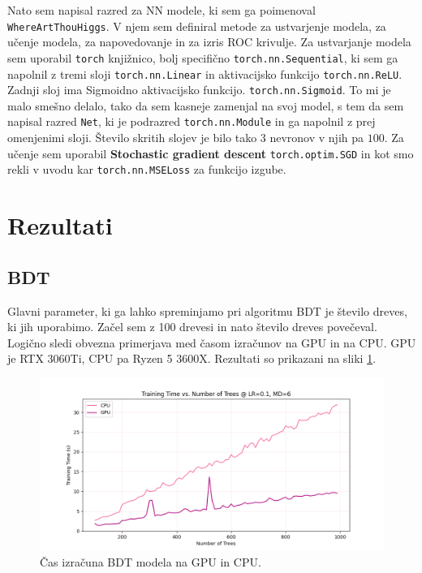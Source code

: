\documentclass[a4paper]{article}
\begin{document}
Nato sem napisal razred za NN modele, ki sem ga poimenoval \texttt{WhereArtThouHiggs}. V njem sem definiral metode za
ustvarjenje modela, za učenje modela, za napovedovanje in za izris ROC krivulje. Za ustvarjanje modela sem uporabil
\texttt{torch} knjižnico, bolj specifično \texttt{torch.nn.Sequential}, ki sem ga napolnil z tremi sloji 
\texttt{torch.nn.Linear} in aktivacijsko funkcijo \texttt{torch.nn.ReLU}. Zadnji sloj ima Sigmoidno aktivacijsko funkcijo.
\texttt{torch.nn.Sigmoid}. To mi je malo smešno delalo, tako da sem kasneje zamenjal na svoj model, s tem da sem napisal razred
\texttt{Net}, ki je podrazred \texttt{torch.nn.Module} in ga napolnil z prej omenjenimi sloji. Število skritih slojev je bilo tako $3$
nevronov v njih pa $100$. Za učenje sem uporabil \textbf{Stochastic gradient descent} \texttt{torch.optim.SGD} in kot smo 
rekli v uvodu kar \texttt{torch.nn.MSELoss} za funkcijo izgube.
\section{Rezultati}
\subsection{BDT}
Glavni parameter, ki ga lahko spreminjamo pri algoritmu BDT je število dreves, ki jih uporabimo. Začel sem z 100 drevesi in
nato število dreves povečeval. Logično sledi obvezna primerjava med časom izračunov na GPU in na CPU. GPU je RTX 3060Ti,
CPU pa Ryzen 5 3600X. Rezultati so prikazani na sliki \ref{fig:BDT_times}. \\

\begin{figure}[H]
    \centering
    \includegraphics[width=1\textwidth]{../images/raw_performance.png}
    \caption{Čas izračuna BDT modela na GPU in CPU.}
    \label{fig:BDT_times}
\end{figure}
\end{document}
